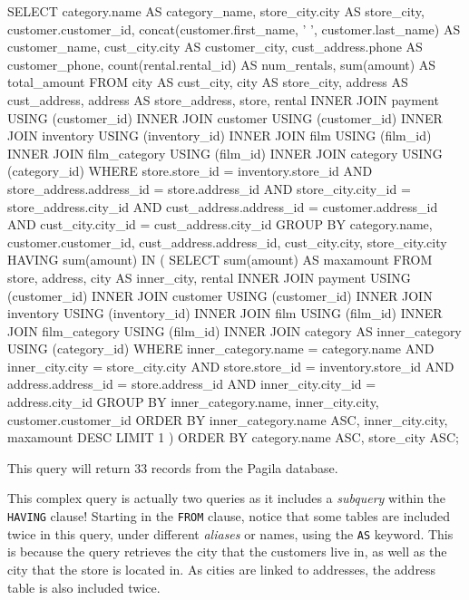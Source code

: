 \begin{withcode}
\begin{sqlcode}
SELECT category.name AS category_name, 
       store_city.city AS store_city,
       customer.customer_id, 
       concat(customer.first_name, ' ', 
           customer.last_name) AS customer_name,
       cust_city.city AS customer_city,
       cust_address.phone AS customer_phone,
       count(rental.rental_id) AS num_rentals,
       sum(amount) AS total_amount
 FROM city AS cust_city, city AS store_city, 
      address AS cust_address, address AS store_address, 
      store, rental
 INNER JOIN payment USING (customer_id)
 INNER JOIN customer USING (customer_id)
 INNER JOIN inventory USING (inventory_id)
 INNER JOIN film USING (film_id)
 INNER JOIN film_category USING (film_id)
 INNER JOIN category USING (category_id)
 WHERE store.store_id = inventory.store_id
   AND store_address.address_id = store.address_id
   AND store_city.city_id = store_address.city_id
   AND cust_address.address_id = customer.address_id
   AND cust_city.city_id = cust_address.city_id
 GROUP BY category.name, customer.customer_id, 
         cust_address.address_id, cust_city.city, store_city.city
 HAVING sum(amount) IN (
  SELECT sum(amount) AS maxamount
   FROM store, address, city AS inner_city, rental
   INNER JOIN payment USING (customer_id)
   INNER JOIN customer USING (customer_id)
   INNER JOIN inventory USING (inventory_id)
   INNER JOIN film USING (film_id)
   INNER JOIN film_category USING (film_id)
   INNER JOIN category AS inner_category USING (category_id)
   WHERE inner_category.name = category.name AND
         inner_city.city = store_city.city AND
         store.store_id = inventory.store_id AND
         address.address_id = store.address_id AND
         inner_city.city_id = address.city_id
   GROUP BY inner_category.name, inner_city.city, 
            customer.customer_id
   ORDER BY inner_category.name ASC, inner_city.city, 
            maxamount DESC
   LIMIT 1 )
 ORDER BY category.name ASC, store_city ASC;
\end{sqlcode}

This query will return 33 records from the Pagila database.

This complex query is actually two queries as it includes a \emph{subquery} within the \texttt{HAVING} clause! Starting in the \texttt{FROM} clause, notice that some tables are included twice in this query, under different \emph{aliases} or names, using the \texttt{AS} keyword. This is because the query retrieves the city that the customers live in, as well as the city that the store is located in. As cities are linked to addresses, the address table is also included twice. 


\end{withcode}
